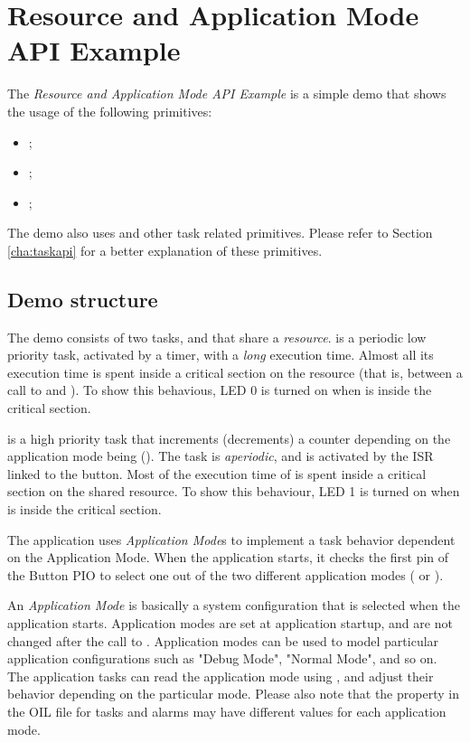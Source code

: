 \chapter{Resource and Application Mode API Example}



The \emph{Resource and Application Mode API Example} is a simple demo
that shows the usage of the following primitives:
\begin{itemize}
\item {};
\item {};
\item {}; 
\end{itemize}
The demo also uses  and
other task related primitives. Please refer to Section
\ref{cha:taskapi} for a better explanation of these primitives.

\section{Demo structure}

The demo consists of two tasks,  and  that
share a \emph{resource}.   is a periodic low priority
task, activated by a timer, with a \emph{long} execution time. Almost
all its execution time is spent inside a critical section on the
resource (that is, between a call to  and
). To show this behavious, LED 0 is turned on when
 is inside the critical section.

 is a high priority task that increments (decrements) a
counter depending on the application mode being 
(). The task is \emph{aperiodic}, and is
activated by the ISR linked to the button. Most of the execution time
of  is spent inside a critical section on the shared
resource. To show this behaviour, LED 1 is turned on when
 is inside the critical section. 

The application uses \emph{Application Mode}s to implement a task
behavior dependent on the Application Mode. When the application
starts, it checks the first pin of the Button PIO to select one out of
the two different application modes ( or
).

An {\em Application Mode} is basically a system configuration that is
selected when the application starts. Application modes are set at
application startup, and are not changed after the call to
.  Application modes can be used to model particular
application configurations such as "Debug Mode", "Normal Mode", and so
on. The application tasks can read the application mode using
, and adjust their behavior depending on
the particular mode. Please also note that the 
property in the OIL file for tasks and alarms may have different
values for each application mode.

